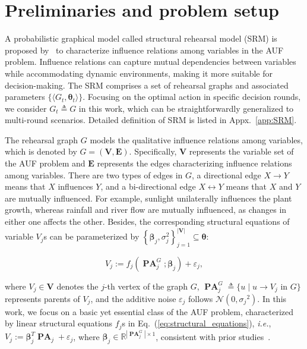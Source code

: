 \documentclass{article}
\theoremstyle{plain}
\theoremstyle{definition}
\def \V {\mathbf{V}}
\def \ie {\textit{i.e.}}
\def \Eq {Eq.}
\def \E {\mathbf{E}}
\def \V {\mathbf{V}}
\def \PA {\mathbf{\operatorname{PA}}}
\def \V {\mathbf{V}}
\begin{document}
\section{Preliminaries and problem setup}
\label{sec:pre}

A probabilistic graphical model called structural rehearsal model (SRM) is proposed by~\citet{qint2023srm} to characterize influence relations among variables in the AUF problem. 
Influence relations can capture mutual dependencies between variables while accommodating dynamic environments, making it more suitable for decision-making. 
The SRM comprises a set of rehearsal graphs and associated parameters $\{\langle G_t, \bm{\theta}_t\rangle\}$. 
Focusing on the optimal action in specific decision rounds, we consider $G_t \triangleq G$ in this work, which can be straightforwardly generalized to multi-round scenarios. 
Detailed definition of SRM is listed in Appx.~\ref{app:SRM}.


The rehearsal graph $G$ models the qualitative influence relations among variables, which is denoted by $G = (\V, \E)$. 
Specifically, $\V$ represents the variable set of the AUF problem and $\E$ represents the edges characterizing influence relations among variables. 
There are two types of edges in $G$, a directional edge $X\rightarrow Y$ means that $X$ influences $Y$, and a bi-directional edge $X\leftrightarrow Y$ means that $X$ and $Y$ are mutually influenced. 
For example, sunlight unilaterally influences the plant growth, whereas rainfall and river flow are mutually influenced, as changes in either one affects the other. 
Besides, the corresponding structural equations of variable $V_j$s can be parameterized by $\left\{\bm{\beta}_{j}, \sigma^2_{j}\right\}_{j=1}^{|\V|} \subseteq\bm{\theta}$:



\vskip -0.03in
\begin{equation}
  \label{eq:structural_equations}
  V_{j} := f_{j}\left(\PA_j^G; \bm{\beta}_{j}\right) + \varepsilon_{j},
\end{equation}

\newpage
where $V_{j} \in \V$ denotes the $j$-th vertex of the graph $G$, $\PA_j^G \triangleq \{u \mid u \to V_j \text{ in } G\}$ represents parents of $V_j$, and the additive noise $\varepsilon_{j}$ follows $\mathcal{N}(0, {\sigma_j}^2)$. 
In this work, we focus on a basic yet essential class of the AUF problem, characterized by linear structural equations $f_{j}$s in \Eq~(\ref{eq:structural_equations}), \ie, $V_{j} := \bm{\beta}_{j}^T \PA_j + \varepsilon_j$, where $\bm{\beta}_j \in \mathbb{R}^{|\PA_j^G| \times 1}$, consistent with prior studies~\citep{qint2023srm, du2024micns}.
\end{document}
